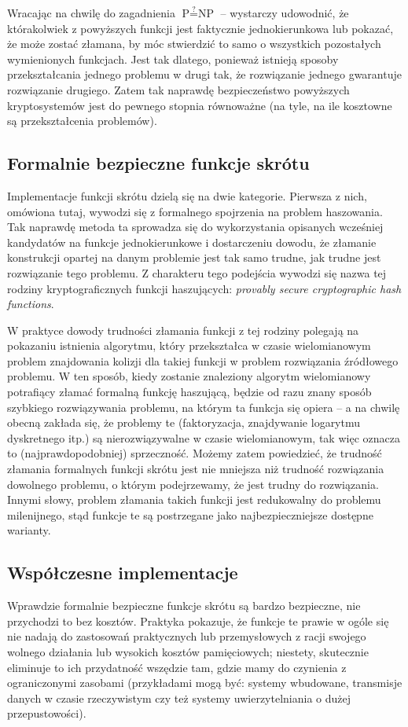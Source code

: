 \documentclass[12pt,a4paper,twoside]{article}
\begin{document}
Wracając na chwilę do zagadnienia $\textrm{P} \stackrel{?}{=} \textrm{NP}$ --
wystarczy udowodnić, że którakolwiek z powyższych funkcji jest faktycznie
jednokierunkowa lub pokazać, że może zostać złamana, by móc stwierdzić to samo
o wszystkich pozostałych wymienionych funkcjach. Jest tak dlatego, ponieważ
istnieją sposoby przekształcania jednego problemu w drugi tak, że rozwiązanie
jednego gwarantuje rozwiązanie drugiego. Zatem tak naprawdę bezpieczeństwo
powyższych kryptosystemów jest do pewnego stopnia równoważne (na tyle, na ile
kosztowne są przekształcenia problemów).



\subsection{Formalnie bezpieczne funkcje skrótu}
Implementacje funkcji skrótu dzielą się na dwie kategorie. Pierwsza z nich,
omówiona tutaj, wywodzi się z formalnego spojrzenia na problem haszowania. Tak
naprawdę metoda ta sprowadza się do wykorzystania opisanych wcześniej
kandydatów na funkcje jednokierunkowe i dostarczeniu dowodu, że złamanie
konstrukcji opartej na danym problemie jest tak samo trudne, jak trudne jest
rozwiązanie tego problemu. Z charakteru tego podejścia wywodzi się nazwa tej
rodziny kryptograficznych funkcji haszujących: \textit{provably secure
cryptographic hash functions}.

W praktyce dowody trudności złamania funkcji z tej rodziny polegają na
pokazaniu istnienia algorytmu, który przekształca w czasie wielomianowym
problem znajdowania kolizji dla takiej funkcji w problem rozwiązania źródłowego
problemu. W ten sposób, kiedy zostanie znaleziony algorytm wielomianowy
potrafiący złamać formalną funkcję haszującą, będzie od razu znany sposób
szybkiego rozwiązywania problemu, na którym ta funkcja się opiera -- a na
chwilę obecną zakłada się, że problemy te (faktoryzacja, znajdywanie logarytmu
dyskretnego itp.) są nierozwiązywalne w czasie wielomianowym, tak więc oznacza
to (najprawdopodobniej) sprzeczność. Możemy zatem powiedzieć, że trudność
złamania formalnych funkcji skrótu jest nie mniejsza niż trudność rozwiązania
dowolnego problemu, o którym podejrzewamy, że jest trudny do rozwiązania.
Innymi słowy, problem złamania takich funkcji jest redukowalny do problemu
milenijnego, stąd funkcje te są postrzegane jako najbezpieczniejsze dostępne
warianty.



\subsection{Współczesne implementacje}
Wprawdzie formalnie bezpieczne funkcje skrótu są bardzo bezpieczne, nie
przychodzi to bez kosztów. Praktyka pokazuje, że funkcje te prawie w ogóle się
nie nadają do zastosowań praktycznych lub przemysłowych z racji swojego wolnego
działania lub wysokich kosztów pamięciowych; niestety, skutecznie eliminuje to
ich przydatność wszędzie tam, gdzie mamy do czynienia z ograniczonymi zasobami
(przykładami mogą być: systemy wbudowane, transmisje danych w czasie
rzeczywistym czy też systemy uwierzytelniania o dużej przepustowości).
\end{document}
